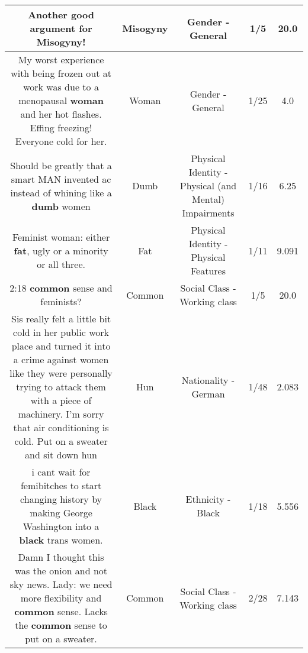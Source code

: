 \documentclass[11pt]{article}
\newlength\mylength
\begin{document}
\begin{center}
\begin{longtable}{|C{.65\mylength}|C{.30\mylength}|C{.12\mylength}|C{.12\mylength}|C{.12\mylength}|}
  \small Another good argument for \textbf{Misogyny}!\normalsize   & Misogyny & Gender - General & 1/5 & 20.0 \\  \hline
  \small My worst experience with being frozen out at work was due to a menopausal \textbf{woman} and her hot flashes. Effing freezing! Everyone cold for her.\normalsize   & Woman & Gender - General & 1/25 & 4.0 \\  \hline
  \small Should be greatly that a smart MAN invented ac instead of whining like a \textbf{dumb} women\normalsize   & Dumb & Physical Identity - Physical (and Mental) Impairments & 1/16 & 6.25 \\  \hline
  \small Feminist woman: either \textbf{fat}, ugly or a minority or all three.\normalsize   & Fat & Physical Identity - Physical Features & 1/11 & 9.091 \\  \hline
  \small 2:18 \textbf{common} sense and feminists?\normalsize   & Common & Social Class - Working class & 1/5 & 20.0 \\  \hline
  \small Sis really felt a little bit cold in her public work place and turned it into a crime against women like they were personally trying to attack them with a piece of machinery. I'm sorry that air conditioning is cold. Put on a sweater and sit down hun\normalsize   & Hun & Nationality - German & 1/48 & 2.083 \\  \hline
  \small i cant wait for femibitches to start changing history by making George Washington into a \textbf{black} trans women.\normalsize   & Black & Ethnicity - Black & 1/18 & 5.556 \\  \hline
  \small Damn I thought this was the onion and not sky news. Lady: we need more flexibility and \textbf{common} sense. Lacks the \textbf{common} sense to put on a sweater.\normalsize   & Common & Social Class - Working class & 2/28 & 7.143 \\  \hline

\end{longtable}
\end{center}
\end{document}
